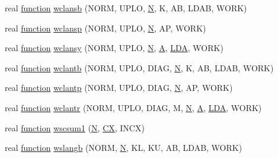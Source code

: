 \begin{DoxyCompactItemize}
\item 
real \hyperlink{afunc_8m_a7b5e596df91eadea6c537c0825e894a7}{function} \hyperlink{wrap__dummy__accelerate_8f_ac65b84f8809cee28af89e6d1c31a0db2}{wclansb} (N\+O\+R\+M, U\+P\+L\+O, \hyperlink{polmisc_8c_a0240ac851181b84ac374872dc5434ee4}{N}, K, A\+B, L\+D\+A\+B, W\+O\+R\+K)
\item 
real \hyperlink{afunc_8m_a7b5e596df91eadea6c537c0825e894a7}{function} \hyperlink{wrap__dummy__accelerate_8f_a02b78e8d97211f8f821ac078ef74978c}{wclansp} (N\+O\+R\+M, U\+P\+L\+O, \hyperlink{polmisc_8c_a0240ac851181b84ac374872dc5434ee4}{N}, A\+P, W\+O\+R\+K)
\item 
real \hyperlink{afunc_8m_a7b5e596df91eadea6c537c0825e894a7}{function} \hyperlink{wrap__dummy__accelerate_8f_aeed68e4a00da4a4808f7930add8faa21}{wclansy} (N\+O\+R\+M, U\+P\+L\+O, \hyperlink{polmisc_8c_a0240ac851181b84ac374872dc5434ee4}{N}, \hyperlink{classA}{A}, \hyperlink{example__user_8c_ae946da542ce0db94dced19b2ecefd1aa}{L\+D\+A}, W\+O\+R\+K)
\item 
real \hyperlink{afunc_8m_a7b5e596df91eadea6c537c0825e894a7}{function} \hyperlink{wrap__dummy__accelerate_8f_aa7c574819d79e71bb9682e19f9312945}{wclantb} (N\+O\+R\+M, U\+P\+L\+O, D\+I\+A\+G, \hyperlink{polmisc_8c_a0240ac851181b84ac374872dc5434ee4}{N}, K, A\+B, L\+D\+A\+B, W\+O\+R\+K)
\item 
real \hyperlink{afunc_8m_a7b5e596df91eadea6c537c0825e894a7}{function} \hyperlink{wrap__dummy__accelerate_8f_aed0a2dd9279e2321a6b19854ab65e644}{wclantp} (N\+O\+R\+M, U\+P\+L\+O, D\+I\+A\+G, \hyperlink{polmisc_8c_a0240ac851181b84ac374872dc5434ee4}{N}, A\+P, W\+O\+R\+K)
\item 
real \hyperlink{afunc_8m_a7b5e596df91eadea6c537c0825e894a7}{function} \hyperlink{wrap__dummy__accelerate_8f_a36d4e66050f874cc703de63f70f8a28a}{wclantr} (N\+O\+R\+M, U\+P\+L\+O, D\+I\+A\+G, M, \hyperlink{polmisc_8c_a0240ac851181b84ac374872dc5434ee4}{N}, \hyperlink{classA}{A}, \hyperlink{example__user_8c_ae946da542ce0db94dced19b2ecefd1aa}{L\+D\+A}, W\+O\+R\+K)
\item 
real \hyperlink{afunc_8m_a7b5e596df91eadea6c537c0825e894a7}{function} \hyperlink{wrap__dummy__accelerate_8f_a4fe7a7920d1389fac7610039fbf54652}{wscsum1} (\hyperlink{polmisc_8c_a0240ac851181b84ac374872dc5434ee4}{N}, \hyperlink{scsum1_8c_a5a76da95c549c41790389a76e12fdcb5}{C\+X}, I\+N\+C\+X)
\item 
real \hyperlink{afunc_8m_a7b5e596df91eadea6c537c0825e894a7}{function} \hyperlink{wrap__dummy__accelerate_8f_ad83a600c3c4a858a0f5f7aadef725dde}{wslangb} (N\+O\+R\+M, \hyperlink{polmisc_8c_a0240ac851181b84ac374872dc5434ee4}{N}, K\+L, K\+U, A\+B, L\+D\+A\+B, W\+O\+R\+K)

\end{DoxyCompactItemize}
